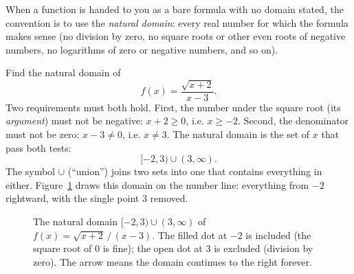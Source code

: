 When a function is handed to you as a bare formula with no domain stated, the
convention is to use the \emph{natural domain}: every real number for which the
formula makes sense (no division by zero, no square roots or other even roots of
negative numbers, no logarithms of zero or negative numbers, and so on).

\begin{example}
\label{ch02:ex-natural-domain}
Find the natural domain of
\[
  f(x) = \frac{\sqrt{x+2}}{\,x-3\,}.
\]
Two requirements must both hold. First, the number under the square root (its
\emph{argument}) must not be negative: $x+2 \ge 0$, i.e. $x \ge -2$. Second, the
denominator must not be zero: $x - 3 \ne 0$, i.e. $x \ne 3$. The natural domain is
the set of $x$ that pass both tests:
\[
  [-2, 3) \cup (3, \infty).
\]
The symbol $\cup$ (``union'') joins two sets into one that contains everything in
either. Figure~\ref{ch02:fig-natural-domain} draws this domain on the number line:
everything from $-2$ rightward, with the single point $3$ removed.
\end{example}

\begin{figure}[htbp]
\centering
{}
\caption{The natural domain $[-2,3)\cup(3,\infty)$ of $f(x)=\sqrt{x+2}\,/\,(x-3)$.
The filled dot at $-2$ is included (the square root of $0$ is fine); the open dot
at $3$ is excluded (division by zero). The arrow means the domain continues to the
right forever.}
\label{ch02:fig-natural-domain}
\end{figure}

